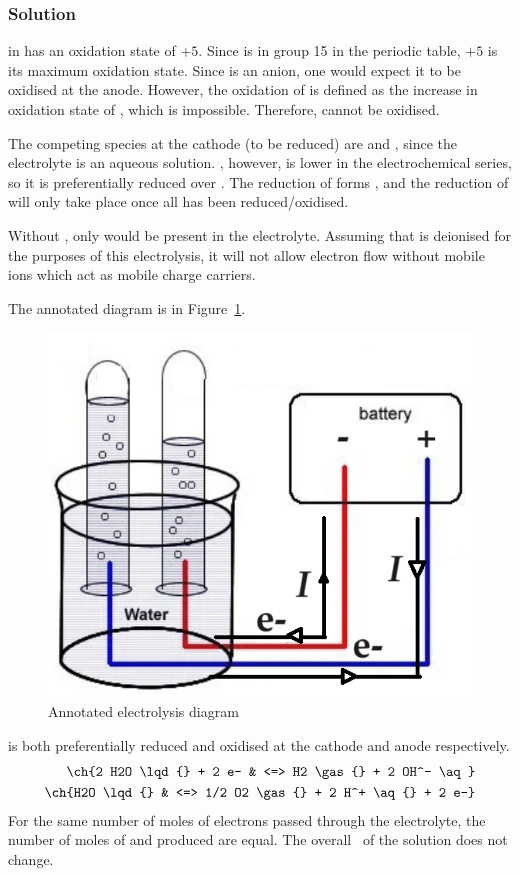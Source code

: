 \subsubsection{Solution}
 in  has an oxidation state of \(+5\). Since  is in
group 15 in the periodic table, \(+5\) is its maximum oxidation state. Since 
is an anion, one would expect it to be oxidised at the anode. However, the
oxidation of  is defined as the increase in oxidation state of ,
which is impossible. Therefore,  cannot be oxidised.

The competing species at the cathode (to be reduced) are  and , since the electrolyte
is an aqueous solution. , however, is lower in the electrochemical series,
so it is preferentially reduced over . The reduction of 
forms , and the reduction of  will only take place once
all  has been reduced/oxidised.

Without , only  would be present in the electrolyte.
Assuming that  is deionised for the purposes of this electrolysis, it
will not allow electron flow without mobile ions which act as mobile charge carriers.

The annotated diagram is in Figure~\ref{fig:nano3-ans}.

\begin{figure}[htpb]
	\centering
	\includegraphics[width=0.4\linewidth]{assets/09_electrolysis_nano3_ans.png}
	\caption{Annotated electrolysis diagram}
	\label{fig:nano3-ans}
\end{figure}

 is both preferentially reduced and oxidised at the cathode and anode
respectively.
\begin{align*}
	\ch{2 H2O \lqd{} + 2 e- & <=> H2 \gas{} + 2 OH^- \aq}             \\
	\ch{H2O \lqd{}          & <=> 1/2 O2 \gas{} + 2 H^+ \aq{} + 2 e-}
\end{align*}
For the same number of moles of electrons passed through the electrolyte, the
number of moles of  and  produced are equal. The overall \pH\
of the solution does not change.

